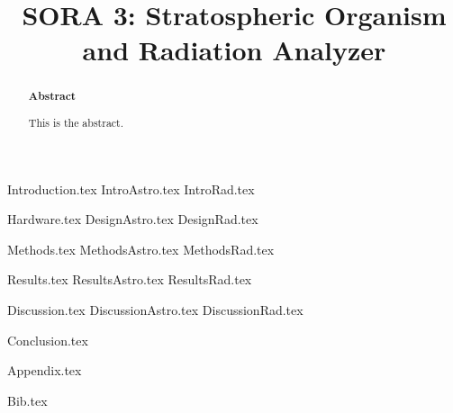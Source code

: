 \documentclass[aps,superscriptaddress,floatfix,nofootinbib,showpacs,amsmath,amssymb,altaffilletter,floatfix,onecolumn]{revtex4-1}
\begin{document}
\title{SORA 3: Stratospheric Organism and Radiation Analyzer}

\begin{abstract}
\begin{center}
{\bf Abstract}
\end{center}
\frenchspacing

This is the abstract.

\newpage %
\end{abstract}

\setlength{\parindent}{1em}
\setdefaultleftmargin{1em}{1em}{}{}{}{}
\setcounter{page}{0}\thispagestyle{empty}
\maketitle
\onecolumngrid
\setcounter{tocdepth}{2}
\setcounter{page}{0}\thispagestyle{empty}
\tableofcontents
\setcounter{page}{0}\thispagestyle{empty}
\newpage
\onecolumngrid

{Introduction.tex}
{IntroAstro.tex}
{IntroRad.tex}

{Hardware.tex}
{DesignAstro.tex}
{DesignRad.tex}

{Methods.tex}
{MethodsAstro.tex}
{MethodsRad.tex}

{Results.tex} 
{ResultsAstro.tex} 
{ResultsRad.tex} 

{Discussion.tex}
{DiscussionAstro.tex}
{DiscussionRad.tex}

{Conclusion.tex} 
\newpage

{Appendix.tex}
\newpage

{Bib.tex}

\clearpage

\end{document}
